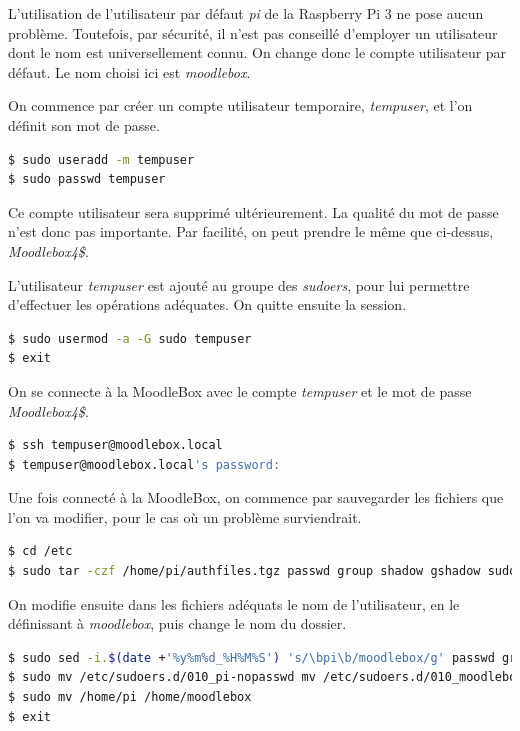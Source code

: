 \documentclass[11pt]{article}
\begin{document}
L'utilisation de l'utilisateur par défaut \emph{pi} de la Raspberry Pi 3 ne pose aucun problème. Toutefois, par sécurité, il n'est pas conseillé d'employer un utilisateur dont le nom est universellement connu. On change donc le compte utilisateur par défaut. Le nom choisi ici est \emph{moodlebox}.

On commence par créer un compte utilisateur temporaire, \emph{tempuser}, et l'on définit son mot de passe.
\begin{lstlisting}[language=bash]
$ sudo useradd -m tempuser
$ sudo passwd tempuser
\end{lstlisting}

Ce compte utilisateur sera supprimé ultérieurement. La qualité du mot de passe n'est donc pas importante. Par facilité, on peut prendre le même que ci-dessus, \emph{Moodlebox4\$}.

L'utilisateur \emph{tempuser} est ajouté au groupe des \emph{sudoers}, pour lui permettre d'effectuer les opérations adéquates. On quitte ensuite la session.

\begin{lstlisting}[language=bash]
$ sudo usermod -a -G sudo tempuser
$ exit
\end{lstlisting}

On se connecte à la MoodleBox avec le compte \emph{tempuser} et le mot de passe \emph{Moodlebox4\$}.

\begin{lstlisting}[language=bash]
$ ssh tempuser@moodlebox.local
$ tempuser@moodlebox.local's password:
\end{lstlisting}

Une fois connecté à la MoodleBox, on commence par sauvegarder les fichiers que l'on va modifier, pour le cas où un problème surviendrait.

\begin{lstlisting}[language=bash]
$ cd /etc
$ sudo tar -czf /home/pi/authfiles.tgz passwd group shadow gshadow sudoers sudoers.d/010_pi-nopasswd systemd/system/autologin@.service
\end{lstlisting}

On modifie ensuite dans les fichiers adéquats le nom de l'utilisateur, en le définissant à \emph{moodlebox}, puis change le nom du dossier.
\begin{lstlisting}[language=bash]
$ sudo sed -i.$(date +'%y%m%d_%H%M%S') 's/\bpi\b/moodlebox/g' passwd group shadow gshadow sudoers sudoers.d/010_pi-nopasswd systemd/system/autologin@.service
$ sudo mv /etc/sudoers.d/010_pi-nopasswd mv /etc/sudoers.d/010_moodlebox-nopasswd
$ sudo mv /home/pi /home/moodlebox
$ exit
\end{lstlisting}
\end{document}
